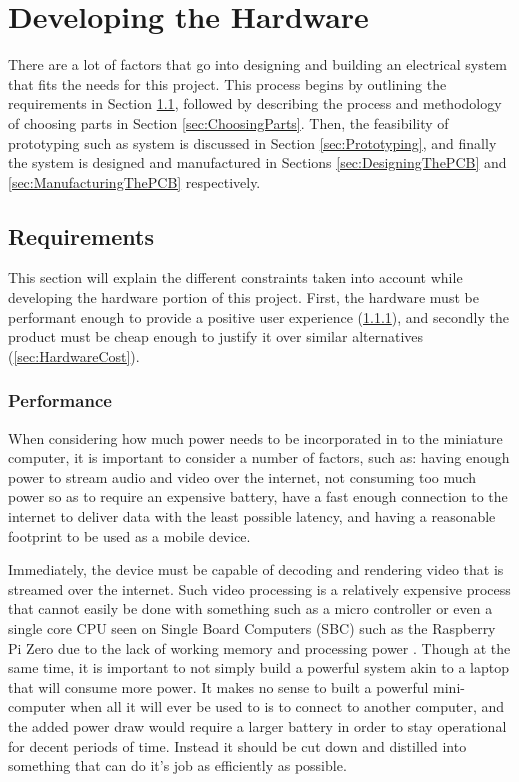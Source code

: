 \chapter{Developing the Hardware} %

\label{Chapter4} %

There are a lot of factors that go into designing and building an electrical system that fits the needs for this project.
This process begins by outlining the requirements in Section \ref{sec:HardwareRequirements}, followed by describing the process and methodology of choosing parts in Section \ref{sec:ChoosingParts}.
Then, the feasibility of prototyping such as system is discussed in Section \ref{sec:Prototyping}, and finally the system is designed and manufactured in Sections \ref{sec:DesigningThePCB} and \ref{sec:ManufacturingThePCB} respectively.

\section{Requirements}\label{sec:HardwareRequirements}

This section will explain the different constraints taken into account while developing the hardware portion of this project.
First, the hardware must be performant enough to provide a positive user experience (\ref{sec:HardwarePerformance}), and secondly the product must be cheap enough to justify it over similar alternatives (\ref{sec:HardwareCost}).

\subsection{Performance}\label{sec:HardwarePerformance}

When considering how much power needs to be incorporated in to the miniature computer, it is important to consider a number of factors, such as: having enough power to stream audio and video over the internet, not consuming too much power so as to require an expensive battery, have a fast enough connection to the internet to deliver data with the least possible latency, and having a reasonable footprint to be used as a mobile device.

Immediately, the device must be capable of decoding and rendering video that is streamed over the internet.
Such video processing is a relatively expensive process that cannot easily be done with something such as a micro controller or even a single core CPU seen on Single Board Computers (SBC) such as the Raspberry Pi Zero due to the lack of working memory and processing power \cite{picockpit_2021}.
Though at the same time, it is important to not simply build a powerful system akin to a laptop that will consume more power.
It makes no sense to built a powerful mini-computer when all it will ever be used to is to connect to another computer, and the added power draw would require a larger battery in order to stay operational for decent periods of time.
Instead it should be cut down and distilled into something that can do it's job as efficiently as possible.

